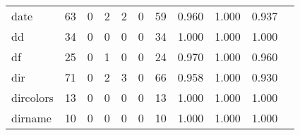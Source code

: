 \begin{longtable}{lp{1.2cm}p{1.2cm}p{1.2cm}p{1.2cm}p{1.2cm}p{1.2cm}p{1.2cm}p{1.2cm}p{1.2cm}p{1.2cm}}
date      &                                    63 &                                                  0 &                                                  2 &                                                  2 &                                                  0 &                                                 59 &                                              0.960 &                                              1.000 &                                              0.937 \\
dd        &                                    34 &                                                  0 &                                                  0 &                                                  0 &                                                  0 &                                                 34 &                                              1.000 &                                              1.000 &                                              1.000 \\
df        &                                    25 &                                                  0 &                                                  1 &                                                  0 &                                                  0 &                                                 24 &                                              0.970 &                                              1.000 &                                              0.960 \\
dir       &                                    71 &                                                  0 &                                                  2 &                                                  3 &                                                  0 &                                                 66 &                                              0.958 &                                              1.000 &                                              0.930 \\
dircolors &                                    13 &                                                  0 &                                                  0 &                                                  0 &                                                  0 &                                                 13 &                                              1.000 &                                              1.000 &                                              1.000 \\
dirname   &                                    10 &                                                  0 &                                                  0 &                                                  0 &                                                  0 &                                                 10 &                                              1.000 &                                              1.000 &                                              1.000 \\

\end{longtable}
